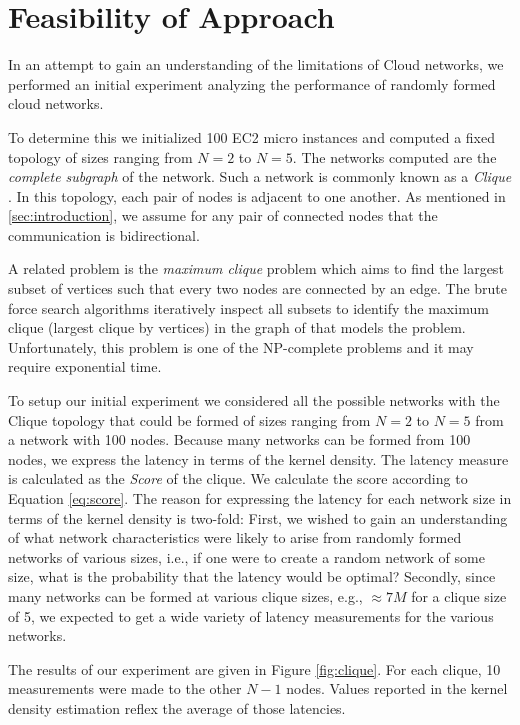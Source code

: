 \section{Feasibility of Approach} \label{sec:feasibility}

In an attempt to gain an understanding of the limitations of Cloud networks, we performed an initial experiment analyzing the performance of randomly formed cloud networks.

To determine this we initialized 100 EC2 micro instances and computed a fixed topology of sizes ranging from $N=2$ to $N=5$. The networks computed are the \textit{complete subgraph} of the network. Such a network is commonly known as a \textit{Clique} \cite{Sipser:2012ta}. In this topology, each pair of nodes is adjacent to one another. As mentioned in \ref{sec:introduction}, we assume for any pair of connected nodes that the communication is bidirectional.  

A related problem is the \textit{maximum clique} problem  which aims to find the largest subset of vertices such that every two nodes are connected by an edge. The brute force search algorithms iteratively inspect all subsets to identify the maximum clique (largest clique by vertices) in the graph of that models the problem. Unfortunately, this problem is one of the NP-complete problems and it may require exponential time.

To setup our initial experiment we considered all the possible networks with the Clique topology that could be formed of sizes ranging from $N=2$ to $N=5$ from a network with 100 nodes. Because many networks can be formed from 100 nodes, we express the latency in terms of the kernel density. The latency measure is calculated as the \textit{Score} of the clique. We calculate the score according to Equation \ref{eq:score}. The reason for expressing the latency for each network size in terms of the kernel density is two-fold: First, we wished to gain an understanding of what network characteristics were likely to arise from randomly formed networks of various sizes, i.e., if one were to create a random network of some size, what is the probability that the latency would be optimal? Secondly, since many networks can be formed at various clique sizes, e.g., $ \approx 7M$ for a clique size of 5, we expected to get a wide variety of latency measurements for the various networks. 


The results of our experiment are given in Figure \ref{fig:clique}. For each clique, 10 measurements were made to the other $N-1$ nodes. Values reported in the kernel density estimation reflex the average of those latencies. 
   
